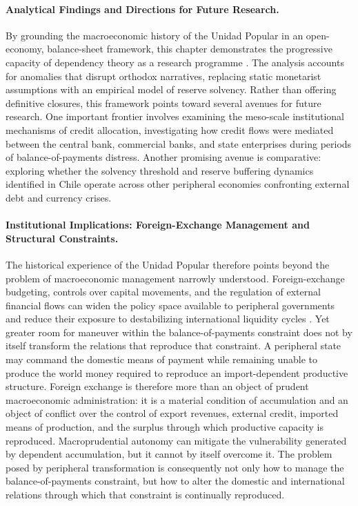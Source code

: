 \paragraph{Analytical Findings and Directions for Future Research.}
By grounding the macroeconomic history of the Unidad Popular in an open-economy, balance-sheet framework, this chapter demonstrates the progressive capacity of dependency theory as a research programme \citep{Kvangraven2021}. The analysis accounts for anomalies that disrupt orthodox narratives, replacing static monetarist assumptions with an empirical model of reserve solvency. Rather than offering definitive closures, this framework points toward several avenues for future research. One important frontier involves examining the meso-scale institutional mechanisms of credit allocation, investigating how credit flows were mediated between the central bank, commercial banks, and state enterprises during periods of balance-of-payments distress. Another promising avenue is comparative: exploring whether the solvency threshold and reserve buffering dynamics identified in Chile operate across other peripheral economies confronting external debt and currency crises.

\paragraph{Institutional Implications: Foreign-Exchange Management and Structural Constraints.}
The historical experience of the Unidad Popular therefore points beyond the problem of macroeconomic management narrowly understood. Foreign-exchange budgeting, controls over capital movements, and the regulation of external financial flows can widen the policy space available to peripheral governments and reduce their exposure to destabilizing international liquidity cycles \citep{FfrenchDavis2018}. Yet greater room for maneuver within the balance-of-payments constraint does not by itself transform the relations that reproduce that constraint. A peripheral state may command the domestic means of payment while remaining unable to produce the world money required to reproduce an import-dependent productive structure. Foreign exchange is therefore more than an object of prudent macroeconomic administration: it is a material condition of accumulation and an object of conflict over the control of export revenues, external credit, imported means of production, and the surplus through which productive capacity is reproduced. Macroprudential autonomy can mitigate the vulnerability generated by dependent accumulation, but it cannot by itself overcome it. The problem posed by peripheral transformation is consequently not only how to manage the balance-of-payments constraint, but how to alter the domestic and international relations through which that constraint is continually reproduced.
